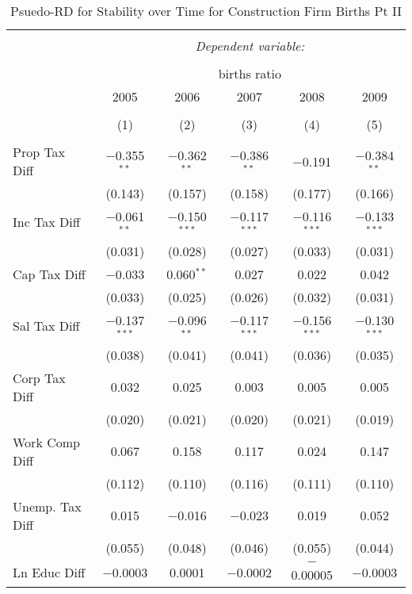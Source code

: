
\begin{table}[!htbp] \centering 
  \caption{Psuedo-RD for Stability over Time for  Construction Firm Births Pt II} 
  \label{23year} 
\small 
\begin{tabular}{@{\extracolsep{5pt}}lccccc} 
\\[-1.8ex]\hline 
\hline \\[-1.8ex] 
 & \multicolumn{5}{c}{\textit{Dependent variable:}} \\ 
\cline{2-6} 
\\[-1.8ex] & \multicolumn{5}{c}{births ratio} \\ 
 & 2005 & 2006 & 2007 & 2008 & 2009 \\ 
\\[-1.8ex] & (1) & (2) & (3) & (4) & (5)\\ 
\hline \\[-1.8ex] 
 Prop Tax Diff & $-$0.355$^{**}$ & $-$0.362$^{**}$ & $-$0.386$^{**}$ & $-$0.191 & $-$0.384$^{**}$ \\ 
  & (0.143) & (0.157) & (0.158) & (0.177) & (0.166) \\ 
  Inc Tax Diff & $-$0.061$^{**}$ & $-$0.150$^{***}$ & $-$0.117$^{***}$ & $-$0.116$^{***}$ & $-$0.133$^{***}$ \\ 
  & (0.031) & (0.028) & (0.027) & (0.033) & (0.031) \\ 
  Cap Tax Diff & $-$0.033 & 0.060$^{**}$ & 0.027 & 0.022 & 0.042 \\ 
  & (0.033) & (0.025) & (0.026) & (0.032) & (0.031) \\ 
  Sal Tax Diff & $-$0.137$^{***}$ & $-$0.096$^{**}$ & $-$0.117$^{***}$ & $-$0.156$^{***}$ & $-$0.130$^{***}$ \\ 
  & (0.038) & (0.041) & (0.041) & (0.036) & (0.035) \\ 
  Corp Tax Diff & 0.032 & 0.025 & 0.003 & 0.005 & 0.005 \\ 
  & (0.020) & (0.021) & (0.020) & (0.021) & (0.019) \\ 
  Work Comp Diff & 0.067 & 0.158 & 0.117 & 0.024 & 0.147 \\ 
  & (0.112) & (0.110) & (0.116) & (0.111) & (0.110) \\ 
  Unemp. Tax Diff & 0.015 & $-$0.016 & $-$0.023 & 0.019 & 0.052 \\ 
  & (0.055) & (0.048) & (0.046) & (0.055) & (0.044) \\ 
  Ln Educ Diff & $-$0.0003 & 0.0001 & $-$0.0002 & $-$0.00005 & $-$0.0003 \\ 

\end{tabular}
\end{table}
